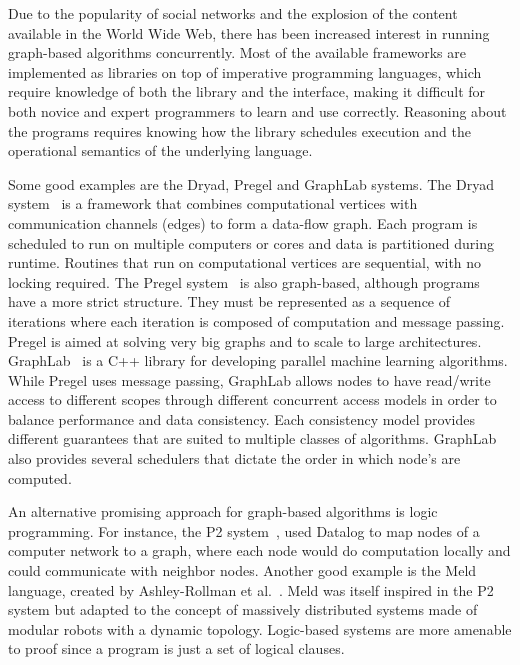 Due to the popularity of social networks and the explosion of the content available in the World Wide Web, there has been
increased interest in running graph-based algorithms concurrently. Most of the available frameworks are implemented as libraries on top
of imperative programming languages, which require knowledge of both the library and the interface, making it difficult
for both novice and expert programmers to learn and use correctly.
Reasoning about the programs requires knowing how
the library schedules execution and the operational semantics of the underlying language.

Some good examples are the Dryad, Pregel and GraphLab systems.
The Dryad system~\cite{Isard:2007:DDD:1272996.1273005} is a framework that combines computational vertices
with communication channels (edges) to form a data-flow graph. Each program is scheduled to
run on multiple computers or cores and data is partitioned during runtime. Routines that run on computational vertices
are sequential, with no locking required.
The Pregel system~\cite{Malewicz:2010:PSL:1807167.1807184} is also graph-based, although programs have a more strict
structure. They must be represented as a sequence of iterations where each iteration is composed of computation and message passing.
Pregel is aimed at solving very big graphs
and to scale to large architectures. GraphLab~\cite{GraphLab2010} is a C++ library for developing parallel machine learning algorithms. While
Pregel uses message passing, GraphLab allows nodes to have read/write access to different scopes through different concurrent access models in order to balance performance and data consistency. Each consistency model provides different guarantees that are suited to multiple classes of algorithms. GraphLab also provides several schedulers that dictate the order in which node's are computed.

An alternative promising approach for graph-based algorithms 
is logic programming. For instance, the P2 system~\cite{Loo-condie-garofalakis-p2}, used Datalog to map nodes of a computer network
to a graph, where each node would do computation locally and could communicate with neighbor nodes.
Another good example is the Meld language, created by
Ashley-Rollman et al.~\cite{ashley-rollman-derosa-iros07wksp,ashley-rollman-iclp09}.
Meld was itself inspired in the P2 system but adapted to the concept of massively distributed systems made of modular robots with a
dynamic topology.
Logic-based systems are more amenable to proof since a program is just a set of logical clauses.

